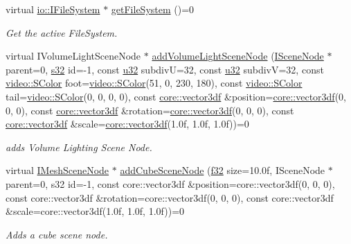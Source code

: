 \begin{DoxyCompactItemize}
virtual \hyperlink{classirr_1_1io_1_1IFileSystem}{io\+::\+I\+File\+System} $\ast$ \hyperlink{classirr_1_1scene_1_1ISceneManager_adbd98fbeba199005cf795a5bae7ccbaf}{get\+File\+System} ()=0
\begin{DoxyCompactList}\small\item\em Get the active File\+System. \end{DoxyCompactList}\item 
virtual I\+Volume\+Light\+Scene\+Node $\ast$ \hyperlink{classirr_1_1scene_1_1ISceneManager_a75fc84dd6ee9140da8fd63357947c724}{add\+Volume\+Light\+Scene\+Node} (\hyperlink{classirr_1_1scene_1_1ISceneNode}{I\+Scene\+Node} $\ast$parent=0, \hyperlink{namespaceirr_ac66849b7a6ed16e30ebede579f9b47c6}{s32} id=-\/1, const \hyperlink{namespaceirr_a0416a53257075833e7002efd0a18e804}{u32} subdivU=32, const \hyperlink{namespaceirr_a0416a53257075833e7002efd0a18e804}{u32} subdivV=32, const \hyperlink{classirr_1_1video_1_1SColor}{video\+::\+S\+Color} foot=\hyperlink{classirr_1_1video_1_1SColor}{video\+::\+S\+Color}(51, 0, 230, 180), const \hyperlink{classirr_1_1video_1_1SColor}{video\+::\+S\+Color} tail=\hyperlink{classirr_1_1video_1_1SColor}{video\+::\+S\+Color}(0, 0, 0, 0), const \hyperlink{namespaceirr_1_1core_a06f169d08b5c429f5575acb7edbad811}{core\+::vector3df} \&position=\hyperlink{namespaceirr_1_1core_a06f169d08b5c429f5575acb7edbad811}{core\+::vector3df}(0, 0, 0), const \hyperlink{namespaceirr_1_1core_a06f169d08b5c429f5575acb7edbad811}{core\+::vector3df} \&rotation=\hyperlink{namespaceirr_1_1core_a06f169d08b5c429f5575acb7edbad811}{core\+::vector3df}(0, 0, 0), const \hyperlink{namespaceirr_1_1core_a06f169d08b5c429f5575acb7edbad811}{core\+::vector3df} \&scale=\hyperlink{namespaceirr_1_1core_a06f169d08b5c429f5575acb7edbad811}{core\+::vector3df}(1.\+0f, 1.\+0f, 1.\+0f))=0
\begin{DoxyCompactList}\small\item\em adds Volume Lighting Scene Node. \end{DoxyCompactList}\item 
virtual \hyperlink{classirr_1_1scene_1_1IMeshSceneNode}{I\+Mesh\+Scene\+Node} $\ast$ \hyperlink{classirr_1_1scene_1_1ISceneManager_a23d1328c68b1585f613108f386fabc1c}{add\+Cube\+Scene\+Node} (\hyperlink{namespaceirr_a0277be98d67dc26ff93b1a6a1d086b07}{f32} size=10.\+0f, I\+Scene\+Node $\ast$parent=0, s32 id=-\/1, const core\+::vector3df \&position=core\+::vector3df(0, 0, 0), const core\+::vector3df \&rotation=core\+::vector3df(0, 0, 0), const core\+::vector3df \&scale=core\+::vector3df(1.\+0f, 1.\+0f, 1.\+0f))=0
\begin{DoxyCompactList}\small\item\em Adds a cube scene node. \end{DoxyCompactList}\item 

\end{DoxyCompactItemize}

